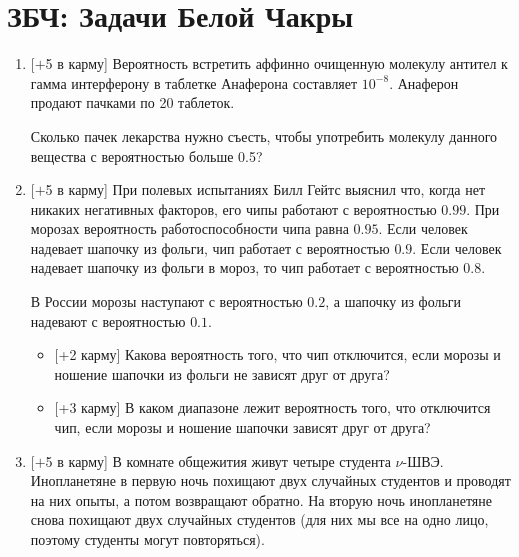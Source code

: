 \documentclass[12pt]{article}
\begin{document}
\newpage

\section*{ЗБЧ: Задачи Белой Чакры}

\begin{enumerate}
    \item %
    $[+$5 в карму] Вероятность встретить аффинно очищенную молекулу антител к гамма интерферону в таблетке Анаферона составляет $10^{-8}$. Анаферон продают пачками по 20 таблеток.
    
    Сколько пачек лекарства нужно съесть, чтобы употребить молекулу данного вещества с вероятностью больше 0.5?

    
    \item  %
    $[+$5 в карму]  При полевых испытаниях Билл Гейтс выяснил что, когда нет никаких негативных факторов, его чипы работают с вероятностью $0.99$. При морозах вероятность работо\-спо\-собности чипа равна $0.95$. Если человек надевает шапочку из фольги, чип работает с веро\-ят\-нос\-тью $0.9$. Если человек надевает шапочку из фольги в мороз, то чип работает с вероятностью $0.8$. 

    В России морозы наступают с вероятностью $0.2$, а шапочку из фольги надевают с вероятностью $0.1$. 

    \begin{itemize}
    \item $[$+2 карму] Какова вероятность того, что чип отключится, если морозы и ношение шапочки из фольги не зависят друг от друга?
    
    \item $[$+3 карму] В каком диапазоне лежит вероятность того, что отключится чип, если морозы и ношение шапочки зависят друг от друга? 
    \end{itemize} 
    
    
    \item  %
    $[+$5 в карму] В комнате общежития живут четыре студента $\nu$-ШВЭ. Инопланетяне в первую ночь похищают двух случайных студентов и проводят на них опыты, а потом возвращают обратно. На вторую ночь инопланетяне снова похищают двух случайных студентов (для них мы все на одно лицо, поэтому студенты могут повторяться). 
    

\end{enumerate}
\end{document}
